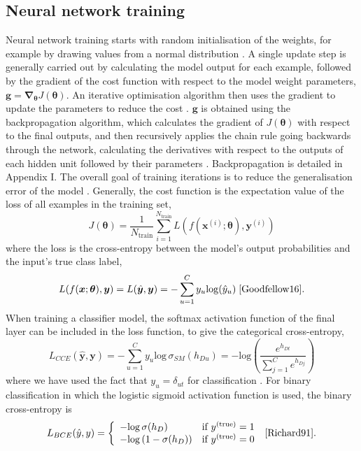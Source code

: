 \documentclass[12pt]{article}
\begin{document}
\subsection{Neural network training}
Neural network training starts with random initialisation of the weights, for example by drawing values from a normal distribution \cite{Goodfellow16}. A single update step is generally carried out by calculating the model output for each example, followed by the gradient of the cost function with respect to the model weight parameters, $\bm{g}=\bm\nabla_{\bm\theta}J(\bm\theta)$. An iterative optimisation algorithm then uses the gradient to update the parameters to reduce the cost \cite{Goodfellow16}. $\bm{g}$ is obtained using the backpropagation algorithm, which calculates the gradient of $J(\bm\theta)$ with respect to the final outputs, and then recursively applies the chain rule going backwards through the network, calculating the derivatives with respect to the outputs of each hidden unit followed by their parameters \cite{Haykin98}. Backpropagation is detailed in Appendix I. The overall goal of training iterations is to reduce the generalisation error of the model \cite{Goodfellow16}. Generally, the cost function is the expectation value of the loss of all examples in the training set,
\begin{equation}
J(\boldsymbol\theta)=\frac{1}{N_{\mathrm{train}}}\sum_{i=1}^{N_{\mathrm{train}}}L(f(\bm{x}^{(i)};\boldsymbol\theta),\bm{y}^{(i)})
\end{equation}
where the loss is the cross-entropy between the model's output probabilities and the input's true class label,
\begin{equation}
L(f(\bm{x};\boldsymbol\theta),\bm{y})=L(\hat{\bm{y}},\bm{y})=-\sum_{u=1}^Cy_u\mathrm{log}(\hat{y}_u)\; \cite{Goodfellow16}.
\end{equation}
When training a classifier model, the softmax activation function of the final layer can be included in the loss function, to give the categorical cross-entropy,
\begin{equation}
L_{CCE}(\hat{\bm{y}},\bm{y})=-\sum_{u=1}^Cy_u\mathrm{log}\,\sigma_{SM}(h_{Du})=-\mathrm{log}\left(\frac{e^{h_{Dt}}}{\sum_{j=1}^{C}e^{h_{Dj}}}\right)
\end{equation}
where we have used the fact that $y_u=\delta_{ut}$ for classification \cite{Kline05}. For binary classification in which the logistic sigmoid activation function is used, the binary cross-entropy is
\begin{equation}
L_{BCE}(\hat{y},y)=
\left\{
\begin{array}{ll}
-\mathrm{log}\,\sigma(h_D) & \mbox{if } y^{(\mathrm{true})}=1 \\
-\mathrm{log}\left(1-\sigma(h_D)\right) & \mbox{if } y^{(\mathrm{true})}=0
\end{array}
\right.\;\cite{Richard91}.
\end{equation}
\end{document}
